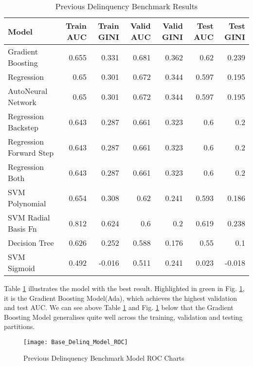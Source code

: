 \begin{table}[H]
	\centering
	\resizebox{\textwidth}{!}
	{
		\begin{tabular}{l | r | r| r |r| r|r}
			\hline
			\textbf{Model} & \textbf{Train AUC} & \textbf{Train GINI} & \textbf{Valid AUC} & \textbf{Valid GINI}& \textbf{Test AUC} & \textbf{Test GINI}\\
			\hline
			\cellcolor{green!25}Gradient Boosting & \cellcolor{green!25}0.655 & \cellcolor{green!25}0.331 & \cellcolor{green!25}0.681 & \cellcolor{green!25}0.362 & \cellcolor{green!25}0.62 & \cellcolor{green!25}0.239 \\
			Regression & 0.65 & 0.301 & 0.672 & 0.344 & 0.597 & 0.195 \\
			AutoNeural Network & 0.65 & 0.301 & 0.672 & 0.344 & 0.597 & 0.195 \\
			Regression Backstep & 0.643 & 0.287 & 0.661 & 0.323 & 0.6 & 0.2 \\
			Regression Forward Step & 0.643 & 0.287 & 0.661 & 0.323 & 0.6 & 0.2 \\
			Regression Both & 0.643 & 0.287 & 0.661 & 0.323 & 0.6 & 0.2 \\
			SVM Polynomial & 0.654 & 0.308 & 0.62 & 0.241 & 0.593 & 0.186 \\
			SVM Radial Basis Fn & 0.812 & 0.624 & 0.6 & 0.2 & 0.619 & 0.238 \\
			Decision Tree & 0.626 & 0.252 & 0.588 & 0.176 & 0.55 & 0.1 \\
			SVM Sigmoid & 0.492 & -0.016 & 0.511 & 0.241 & 0.023 & -0.018 \\
			\hline
		\end{tabular}
	}
	\caption{Previous Delinquency Benchmark Results}
	\label{table:prevdelinqbase}
\end{table}

Table \ref{table:prevdelinqbase} illustrates the model with the best result. Highlighted in green in Fig. \ref{fig:Delinq_Model_ROC}, it is the Gradient Boosting Model(Ada), which achieves the highest validation and test AUC. We can see above Table \ref{table:prevdelinqbase} and Fig. \ref{fig:Delinq_Model_ROC} below that the Gradient Boosting Model
generalises quite well across the training, validation and testing partitions.

\begin{figure}[H]
	\texttt{[image: Base\_Delinq\_Model\_ROC]}
	\caption{Previous Delinquency Benchmark Model ROC Charts}
	\label{fig:Delinq_Model_ROC}
\end{figure}

